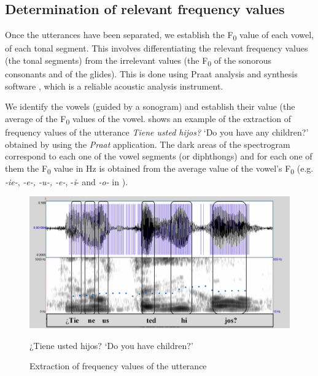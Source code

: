 \documentclass[output=paper]{langscibook}
\begin{document}
\subsection{Determination of relevant frequency values} 

Once the utterances have been separated, we establish the F\textsubscript{0} value of each vowel, of each tonal segment. This involves differentiating the relevant frequency values (the tonal segments) from the irrelevant values (the F\textsubscript{0} of the sonorous consonants and of the glides). This is done using Praat analysis and synthesis software \citep{Boersma.praat}, which is a reliable acoustic analysis instrument.

We identify the vowels (guided by a sonogram) and establish their value (the average of the F\textsubscript{0} values of the vowel.  shows an example of the extraction of frequency values of the utterance \textit{Tiene usted hijos?} ‘Do you have any children?’ obtained by using the \textit{Praat} application. The dark areas of the spectrogram correspond to each one of the vowel segments (or diphthongs) and for each one of them the F\textsubscript{0} value in Hz is obtained from the average value of the vowel’s F\textsubscript{0} (e.g. \textit{-ie-}, \textit{-e-, -u-, -e-}, -\textit{i}- and \textit{-o-} in ).

\begin{figure}
\includegraphics[width=\textwidth]{figures/FON-img3.PNG}
\caption{\label{fig:font:3} Extraction of frequency values of the utterance} ¿Tiene usted hijos? ‘Do you have children?'
\end{figure}
\end{document}
